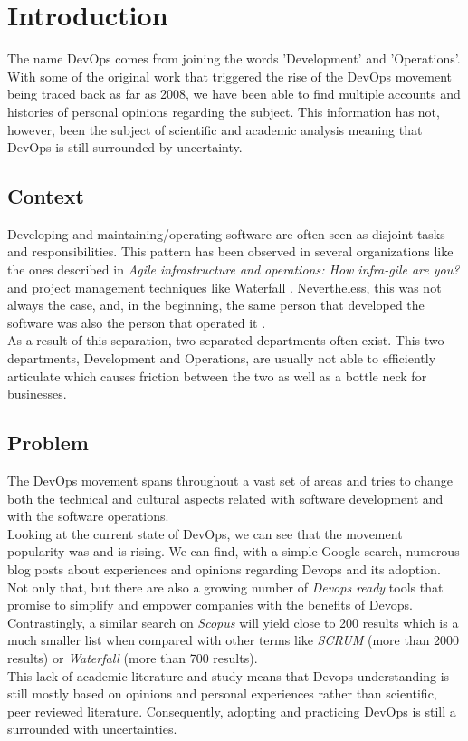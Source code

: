 \chapter{Introduction} \label{chap:introduction}
The name DevOps comes from joining the words 'Development' and 'Operations'. With some of the original work that triggered the rise of the DevOps movement being traced back as far as 2008, we have been able to find multiple accounts and histories of personal opinions regarding the subject. This information has not, however, been the subject of scientific and academic analysis meaning that DevOps is still surrounded by uncertainty.

		\section{Context} \label{chap:introduction:sec:context}
		Developing and maintaining/operating software are often seen as disjoint tasks and responsibilities. This pattern has been observed in several organizations like the ones described in \textit{Agile infrastructure and operations: How infra-gile are you?} \cite{Debois2008} and project management techniques like Waterfall \cite{Royce1970}. Nevertheless, this was not always the case, and, in the beginning, the same person that developed the software was also the person that operated it \cite{Loukides2012}.\\
		As a result of this separation, two separated departments often exist. This two departments, Development and Operations, are usually not able to efficiently articulate which causes friction between the two as well as a bottle neck for businesses.

		\section{Problem} \label{chap:introduction:sec:problem}

		The DevOps movement spans throughout a vast set of areas and tries to change both the technical and cultural aspects related with software development and with the software operations.\\
		Looking at the current state of DevOps, we can see that the movement popularity was and is rising. We can find, with a simple Google search, numerous blog posts about experiences and opinions regarding Devops and its adoption. Not only that, but there are also a growing number of \textit{Devops ready} tools that promise to simplify and empower companies with the benefits of Devops.\\
		Contrastingly, a similar search on \textit{Scopus} will yield close to 200 results which is a much smaller list when compared with other terms like \textit{SCRUM} (more than 2000 results) or \textit{Waterfall} (more than 700 results).\\
		This lack of academic literature and study means that Devops understanding is still mostly based on opinions and personal experiences rather than scientific, peer reviewed literature. Consequently, adopting and practicing DevOps is still a surrounded with uncertainties.

